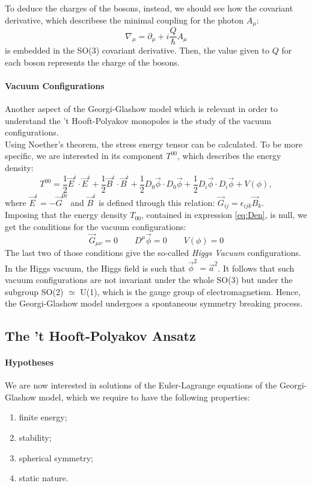 \documentclass[main.tex]{subfiles}
\begin{document}
To deduce the charges of the bosons, instead, we should see how the covariant derivative, which describese the minimal coupling for the photon $A_{\mu}$: 
\begin{equation}
\nabla_\mu = \partial_\mu + i \frac{Q}{\hbar} A_{\mu}
\end{equation}
is embedded in the SO(3) covariant derivative. Then, the value given to $Q$ for each boson represents the charge of the bosons. 

\paragraph{Vacuum Configurations}Another aspect of the Georgi-Glashow model which is relevant in order to understand the 't Hooft-Polyakov monopoles is the study of the vacuum configurations.\\
Using Noether's theorem, the stress energy tensor can be calculated. To be more specific, we are interested in its component $T^{00}$, which describes the energy density: 
\begin{equation}
T^{00} = \frac{1}{2} \Vec{E}^i \cdot  \Vec{E}^i + \frac{1}{2} \Vec{B}^i \cdot \Vec{B}^i +\frac{1}{2} D_0 \Vec{\phi} \cdot D_0 \Vec{\phi} +\frac{1}{2} D_i \Vec{\phi} \cdot  D_i \Vec{\phi} + V(\phi),
\label{eq:Den}
\end{equation}
where $\Vec{E}^i = - \Vec{G}^{0i}$  and $\Vec{B}^i$ is defined through this relation: $ \Vec{G}_{ij} = \epsilon_{ijk} \Vec{B}_k$.\\
Imposing that the energy density $T_{00}$, contained in expression \eqref{eq:Den}, is null, we get the conditions for the vacuum configurations: 
\begin{equation}
\Vec{G}_{\mu \nu} = 0 \qquad D^{\mu} \Vec{\phi}  = 0 \qquad V(\phi)=0
\end{equation}
The last two of those conditions give the so-called \textit{Higgs Vacuum} configurations. 
In the Higgs vacuum, the Higgs field is such that $\vec{\phi}^2 = \vec{a}^2$. It follows that such vacuum configurations are not invariant under the whole SO(3) but under the subgroup SO(2) $\simeq$ U(1), which is the gauge group of electromagnetism. Hence, the Georgi-Glashow model undergoes a spontaneous symmetry breaking process.

\subsection{The 't Hooft-Polyakov Ansatz}
\label{sect:Ansatz}
 \paragraph{Hypotheses}We are now interested in solutions of the Euler-Lagrange equations of the Georgi-Glashow model, which we require to have the following properties: 
 \begin{enumerate}
     \item finite energy; 
     \item stability; 
     \item spherical symmetry;
     \item static nature.
 \end{enumerate}
 
\end{document}
